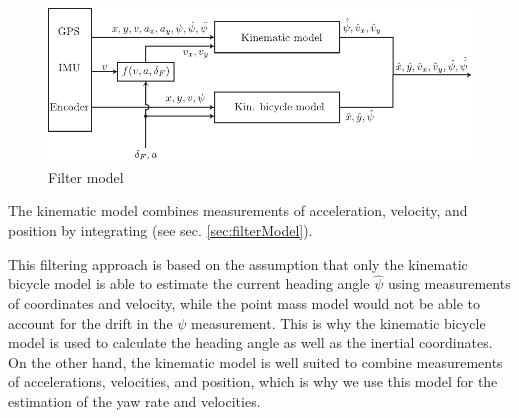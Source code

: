 \begin{figure}[ht]
    \centering
      \includegraphics{../../Figures/Illustrator/FilterModel.pdf}
    \caption{Filter model}
    \label{fig:filter_model}
\end{figure}
The kinematic model combines measurements of acceleration, velocity, and position by integrating (see sec. \ref{sec:filterModel}).

This filtering approach is based on the assumption that only the kinematic bicycle model is able to estimate the current heading angle $\hat\psi$ using measurements of coordinates and velocity, while the point mass model would not be able to account for the drift in the $\psi$ measurement. This is why the kinematic bicycle model is used to calculate the heading angle as well as the inertial coordinates. On the other hand, the kinematic model is well suited to combine measurements of accelerations, velocities, and position, which is why we use this model for the estimation of the yaw rate and velocities.

